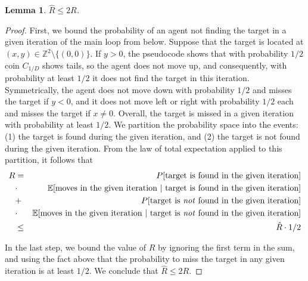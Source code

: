 \documentclass[11pt]{article}
\newtheorem{lemma}[theorem]{Lemma}
\newcommand{\E}{\mathbb{E}}
\newcommand{\Z}{\mathbb{Z}}
\begin{document}
\begin{lemma}
\label{lem:condition}
	 $\hat{R} \leq 2 R$.
\end{lemma}
\begin{proof}

First, we bound the probability of an agent not finding the target in a given iteration of the main loop from below. Suppose that the target is located at $(x,y)\in \Z^2\setminus \{(0,0)\}$. If $y>0$, the pseudocode shows that with probability $1/2$ coin $C_{1/D}$ shows tails, so the agent does not move up, and consequently, with probability at least $1/2$ it does not find the target in this iteration. Symmetrically, the agent does not move down with probability $1/2$ and misses the target if $y<0$, and it does not move left or right with probability $1/2$ each and misses the target if $x\neq 0$. Overall, the target is missed in a given iteration with probability at least $1/2$. We partition the probability space into the events: (1) the target is found during the given iteration, and (2) the target is not found during the given iteration. From the law of total expectation applied to this partition, it follows that 
\begin{eqnarray*}
R & = & P[\text{target is found in the given iteration}] \\
		& \cdot & \E[\text{moves in the given iteration } | \text{ target is found in the given iteration}] \\
		& + & P[\text{target is \emph{not} found in the given iteration}] \\
		& \cdot & \E[\text{moves in the given iteration } | \text{ target is \emph{not} found in the given iteration}] \\
		& \leq & \hat{R} \cdot 1/2
\end{eqnarray*}

In the last step, we bound the value of $R$ by ignoring the first term in the sum, and using the fact above that the probability to miss the target in any given iteration is at least $1/2$. We conclude that $\hat{R} \leq 2 R$.
\end{proof}
\end{document}
